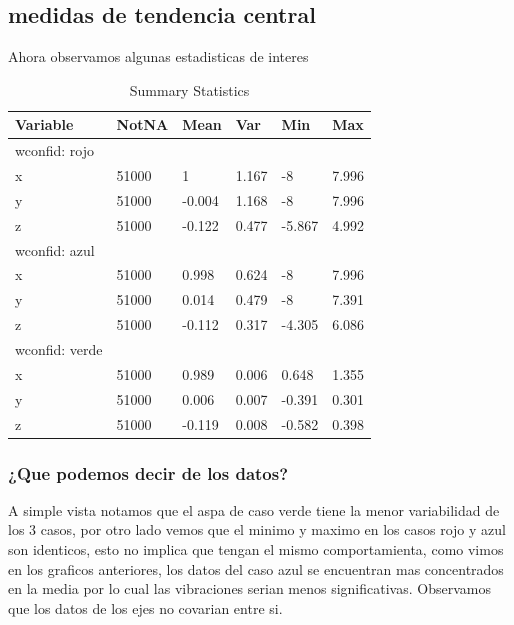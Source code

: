 \documentclass[
]{article}
\begin{document}
\newpage

\hypertarget{medidas-de-tendencia-central}{%
\subsection{medidas de tendencia
central}\label{medidas-de-tendencia-central}}

Ahora observamos algunas estadisticas de interes

\begin{table}

\caption{\label{tab:unnamed-chunk-4}Summary Statistics}
\centering
\begin{tabular}[t]{llllll}
\toprule
Variable & NotNA & Mean & Var & Min & Max\\
\midrule
wconfid: rojo &  &  &  &  & \\
x & 51000 & 1 & 1.167 & -8 & 7.996\\
y & 51000 & -0.004 & 1.168 & -8 & 7.996\\
z & 51000 & -0.122 & 0.477 & -5.867 & 4.992\\
wconfid: azul &  &  &  &  & \\
\addlinespace
x & 51000 & 0.998 & 0.624 & -8 & 7.996\\
y & 51000 & 0.014 & 0.479 & -8 & 7.391\\
z & 51000 & -0.112 & 0.317 & -4.305 & 6.086\\
wconfid: verde &  &  &  &  & \\
x & 51000 & 0.989 & 0.006 & 0.648 & 1.355\\
\addlinespace
y & 51000 & 0.006 & 0.007 & -0.391 & 0.301\\
z & 51000 & -0.119 & 0.008 & -0.582 & 0.398\\
\bottomrule
\end{tabular}
\end{table}

\hypertarget{que-podemos-decir-de-los-datos}{%
\subsubsection{¿Que podemos decir de los
datos?}\label{que-podemos-decir-de-los-datos}}

A simple vista notamos que el aspa de caso verde tiene la menor
variabilidad de los 3 casos, por otro lado vemos que el minimo y maximo
en los casos rojo y azul son identicos, esto no implica que tengan el
mismo comportamienta, como vimos en los graficos anteriores, los datos
del caso azul se encuentran mas concentrados en la media por lo cual las
vibraciones serian menos significativas. Observamos que los datos de los
ejes no covarian entre si.
\end{document}
